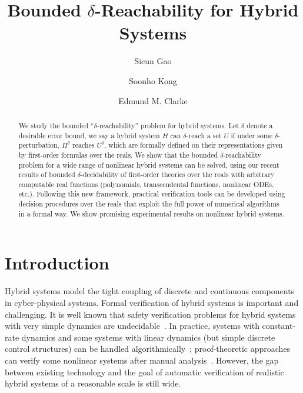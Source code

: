 \documentclass[envcountsect]{llncs}
\title{Bounded $\delta$-Reachability for Hybrid Systems}
\author{Sicun Gao \and Soonho Kong \and Edmund M. Clarke}
\institute{Carnegie Mellon University, Pittsburgh, PA 15213}
\begin{document}
\maketitle

\begin{abstract}
We study the bounded ``$\delta$-reachability'' problem for hybrid systems. Let
$\delta$ denote a desirable error bound, we say a hybrid system $H$ can
$\delta$-reach a set $U$ if under some $\delta$-perturbation, $H^{\delta}$
reaches $U^{\delta}$, which are formally defined on their representations given
by first-order formulas over the reals. We show that the bounded
$\delta$-reachability problem for a wide range of nonlinear hybrid systems can
be solved, using our recent results of bounded $\delta$-decidability of
first-order theories over the reals with arbitrary computable real functions
(polynomials, transcendental functions, nonlinear ODEs, etc.). Following this
new framework, practical verification
tools can be developed using decision procedures over the reals that exploit
the full power of numerical algorithms in a formal way. We show promising
experimental results on nonlinear hybrid systems. 

\end{abstract}

\section{Introduction}

Hybrid systems model the tight coupling of discrete and continuous components
in cyber-physical systems. Formal verification of hybrid systems is
important and challenging. It is well known that safety verification
problems for hybrid systems with very simple dynamics are
undecidable~\cite{DBLP:journals/tse/AlurHH96,DBLP:journals/jcss/HenzingerKPV98,
DBLP:journals/tcs/Bournez99}. In practice, systems
with constant-rate dynamics
and some systems with linear dynamics (but simple discrete control structures)
can be handled
algorithmically~\cite{DBLP:journals/tse/AlurHH96,lpw:sttt97,DBLP:conf/hybrid/ChutinanK99,DBLP:conf/hybrid/AsarinDMB00,DBLP:conf/cav/AsarinDM02,DBLP:conf/hybrid/GirardGM06,DBLP:conf/cav/GuernicG09}; proof-theoretic
approaches can verify some nonlinear systems after manual analysis~\cite{DBLP:journals/logcom/Platzer10,DBLP:conf/hybrid/Sankaranarayanan10}.
However, the gap between existing technology
and the goal of automatic verification of realistic hybrid systems of a
reasonable scale is still wide.
\end{document}

